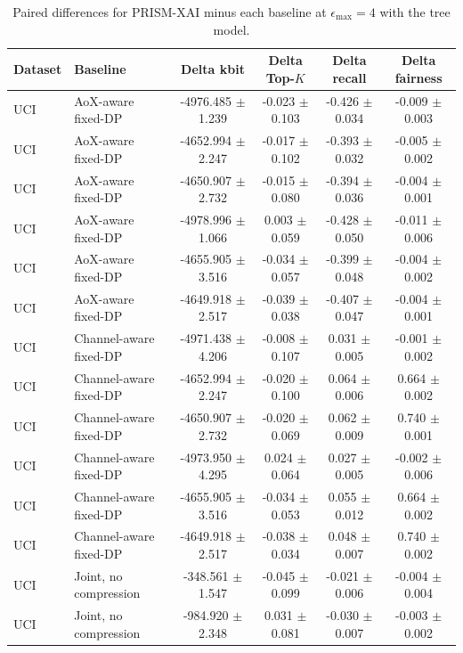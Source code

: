 \begin{table}[t]
\caption{Paired differences for PRISM-XAI minus each baseline at $\epsilon_{\max}=4$ with the tree model.}
\label{tab:paired-differences}
\centering
\scriptsize
\setlength{\tabcolsep}{3pt}
\begin{tabular}{llcccc}
\toprule
Dataset & Baseline & Delta kbit & Delta Top-$K$ & Delta recall & Delta fairness \\
\midrule
UCI & AoX-aware fixed-DP & -4976.485 $\pm$ 1.239 & -0.023 $\pm$ 0.103 & -0.426 $\pm$ 0.034 & -0.009 $\pm$ 0.003 \\
UCI & AoX-aware fixed-DP & -4652.994 $\pm$ 2.247 & -0.017 $\pm$ 0.102 & -0.393 $\pm$ 0.032 & -0.005 $\pm$ 0.002 \\
UCI & AoX-aware fixed-DP & -4650.907 $\pm$ 2.732 & -0.015 $\pm$ 0.080 & -0.394 $\pm$ 0.036 & -0.004 $\pm$ 0.001 \\
UCI & AoX-aware fixed-DP & -4978.996 $\pm$ 1.066 & 0.003 $\pm$ 0.059 & -0.428 $\pm$ 0.050 & -0.011 $\pm$ 0.006 \\
UCI & AoX-aware fixed-DP & -4655.905 $\pm$ 3.516 & -0.034 $\pm$ 0.057 & -0.399 $\pm$ 0.048 & -0.004 $\pm$ 0.002 \\
UCI & AoX-aware fixed-DP & -4649.918 $\pm$ 2.517 & -0.039 $\pm$ 0.038 & -0.407 $\pm$ 0.047 & -0.004 $\pm$ 0.001 \\
UCI & Channel-aware fixed-DP & -4971.438 $\pm$ 4.206 & -0.008 $\pm$ 0.107 & 0.031 $\pm$ 0.005 & -0.001 $\pm$ 0.002 \\
UCI & Channel-aware fixed-DP & -4652.994 $\pm$ 2.247 & -0.020 $\pm$ 0.100 & 0.064 $\pm$ 0.006 & 0.664 $\pm$ 0.002 \\
UCI & Channel-aware fixed-DP & -4650.907 $\pm$ 2.732 & -0.020 $\pm$ 0.069 & 0.062 $\pm$ 0.009 & 0.740 $\pm$ 0.001 \\
UCI & Channel-aware fixed-DP & -4973.950 $\pm$ 4.295 & 0.024 $\pm$ 0.064 & 0.027 $\pm$ 0.005 & -0.002 $\pm$ 0.006 \\
UCI & Channel-aware fixed-DP & -4655.905 $\pm$ 3.516 & -0.034 $\pm$ 0.053 & 0.055 $\pm$ 0.012 & 0.664 $\pm$ 0.002 \\
UCI & Channel-aware fixed-DP & -4649.918 $\pm$ 2.517 & -0.038 $\pm$ 0.034 & 0.048 $\pm$ 0.007 & 0.740 $\pm$ 0.002 \\
UCI & Joint, no compression & -348.561 $\pm$ 1.547 & -0.045 $\pm$ 0.099 & -0.021 $\pm$ 0.006 & -0.004 $\pm$ 0.004 \\
UCI & Joint, no compression & -984.920 $\pm$ 2.348 & 0.031 $\pm$ 0.081 & -0.030 $\pm$ 0.007 & -0.003 $\pm$ 0.002 \\

\end{tabular}
\end{table}
